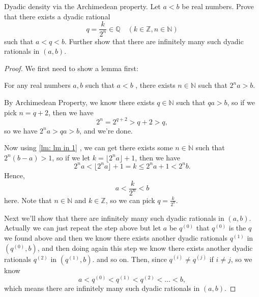 
\begin{problem}[10pts]
Dyadic density via the Archimedean property. Let \(a < b\)  be real numbers. Prove that there exists a dyadic rational
\[
  q = \frac{k}{2^n} \in \mathbb{Q} \quad (k \in \mathbb{Z}, n \in \mathbb{N} )
\]
such that \(a < q < b\). Further show that there are infinitely many such dyadic
rationals in \((a,b)\).
\end{problem}
\begin{proof}
We first need to show a lemma first:
\begin{lemma}\label{lm: lm in 1}
  For any real numbers \(a, b\) such that \(a<b\) , there exists \(n \in \mathbb{N} \) such that \(2^n a > b\).   
\end{lemma}
\begin{explanation}
By Archimedean Property, we know there exists \(q \in \mathbb{N} \) such that \(qa > b\), so if we pick \(n = q+2\), then we have 
\[
  2^n = 2^{q+2} > q+2 > q, 
\] 
so we have \(2^n a > qa > b\), and we're done.  
\end{explanation}
Now using \autoref{lm: lm in 1} , we can get there exists some \(n \in \mathbb{N} \) such that \(2^n(b-a)>1\), so if we let \(k = \lfloor 2^n a \rfloor + 1\), then we have 
\[
  2^n a < \lfloor 2^n a \rfloor + 1 = k \le 2^n a + 1 < 2^n b.
\]   
Hence, 
\[
  a < \frac{k}{2^n} < b
\]
here. Note that \(n \in \mathbb{N} \) and \(k \in \mathbb{Z} \), so we can pick \(q = \frac{k}{2^n}\).

Next we'll show that there are infinitely many such dyadic rationals in \((a,b)\). Actually we can just repeat the step above but let \(a\) be \(q^{(0)}\) that \(q^{(0)}\) is the \(q\) we found above and then we know there exists another dyadic rationals \(q^{(1)}\)  in \((q^{(0)}, b)\), and then doing again this step we know there exists another dyadic rationals \(q^{(2)}\) in \((q^{(1)}, b)\). and so on. Then, since \(q^{(i)} \neq q^{(j)}\) if \(i \neq j\), so we know 
\[
  a < q^{(0)} < q^{(1)} < q^{(2)} < \dots < b,
\]  which means there are infinitely many such dyadic rationals in \((a,b)\). 
\end{proof}


